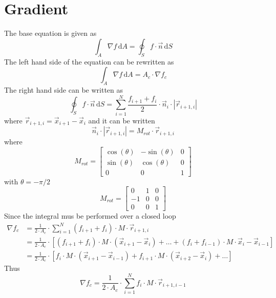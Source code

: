 \section{Gradient}
The base equation is given as
\begin{equation}
    \int_A \nabla f \, \mathrm{d}A = \oint_S f \cdot \vec{n} \, \mathrm{d}S
\end{equation}
The left hand side of the equation can be rewritten as
\begin{equation}
    \int_A \nabla f \, \mathrm{d}A = A_c \cdot \nabla f_c
\end{equation}
The right hand side can be written as
\begin{equation}
    \oint_S f \cdot \vec{n} \, \mathrm{d}S = \sum_{i = 1}^N \frac{f_{i + 1} + f_i}{2} \cdot \vec{n}_i \cdot |\vec{r}_{i+1, i}|
\end{equation}
where $\vec{r}_{i+1, i} = \vec{x}_{i + 1} - \vec{x}_i$ and it can be written
\begin{equation}
    \vec{n}_i \cdot |\vec{r}_{i+1, i}| = M_{rot} \cdot \vec{r}_{i+1, i}
\end{equation}
where
\begin{equation}
    M_{rot} = 
    \begin{bmatrix}
       \cos(\theta) & -\sin(\theta) & 0 \\
       \sin(\theta) &  \cos(\theta) & 0 \\
       0 & 0 & 1
     \end{bmatrix}
\end{equation}
with $\theta = -\pi /2$
\begin{equation}
    M_{rot} = 
    \begin{bmatrix}
       0 & 1 & 0 \\
       -1 &  0 & 0 \\
       0 & 0 & 1
     \end{bmatrix}
\end{equation}
Since the integral mus be performed over a closed loop
\begin{equation}
    \begin{split}
         \nabla f_c &= \frac{1}{2 \cdot A_c} \cdot \sum_{i = 1}^N (f_{i + 1} + f_i) \cdot M \cdot \vec{r}_{i + 1,i} \\
         &= \frac{1}{2 \cdot A_c} \cdot \left[ (f_{i + 1} + f_i) \cdot M \cdot (\vec{x}_{i + 1} - \vec{x}_i) + \dots + (f_{i} + f_{i - 1}) \cdot M \cdot \vec{x}_{i} - \vec{x}_{i - 1} \right] \\
         &= \frac{1}{2 \cdot A_c} \cdot \left[ f_i \cdot M \cdot (\vec{x}_{i + 1} - \vec{x}_{i - 1}) + f_{i + 1} \cdot M \cdot (\vec{x}_{i + 2} - \vec{x}_{i}) + \dots \right]
    \end{split}
\end{equation}
Thus
\begin{equation}
    \label{eqn:gradient}
    \nabla f_c = \frac{1}{2 \cdot A_c} \cdot \sum_{i = 1}^N f_i \cdot M \cdot \vec{r}_{i + 1,i - 1}
\end{equation}

